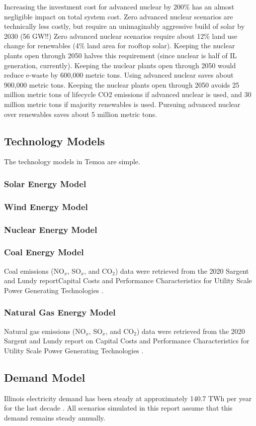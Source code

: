 Increasing the investment cost for advanced nuclear by 200\% has an almost negligible impact on total system cost.
Zero advanced nuclear scenarios are technically less costly, but require an unimaginably aggressive build of solar by 2030 (56 GW!!)
Zero advanced nuclear scenarios require about 12\% land use change for 
renewables (4\% land area for rooftop solar). Keeping the nuclear plants open through 2050 halves this requirement (since nuclear is half of IL generation, currently).
Keeping the nuclear plants open through 2050 would reduce e-waste by 600,000 metric tons. Using advanced nuclear saves about 900,000 metric tons.
Keeping the nuclear plants open through 2050 avoids 25 million metric tons of lifecycle CO2 emissions if advanced nuclear is used, and 30 million metric tons if majority renewables is used. Pursuing advanced nuclear over renewables saves about 5 million metric tons.
\subsection{Technology Models}
The technology models in Temoa are simple. 
\subsubsection{Solar Energy Model}
\subsubsection{Wind Energy Model}
\subsubsection{Nuclear Energy Model}
\subsubsection{Coal Energy Model}
Coal emissions (NO$_x$, SO$_x$, and CO$_2$) data were retrieved from the 2020 Sargent and Lundy reportCapital Costs and Performance Characteristics for Utility Scale Power Generating Technologies \cite{sargent__lundy_capital_2020}.
\subsubsection{Natural Gas Energy Model}
Natural gas emissions (NO$_x$, SO$_x$, and CO$_2$) data were retrieved from the 
2020 Sargent and Lundy report on Capital Costs and Performance Characteristics 
for Utility Scale Power Generating Technologies 
\cite{sargent__lundy_capital_2020}.
\subsection{Demand Model}
Illinois electricity demand has been steady at approximately 140.7 TWh per year
for the last decade
\cite{us_energy_information_administration_eia_illinois_2020}. All scenarios
simulated in this report assume that this demand remains steady annually.


